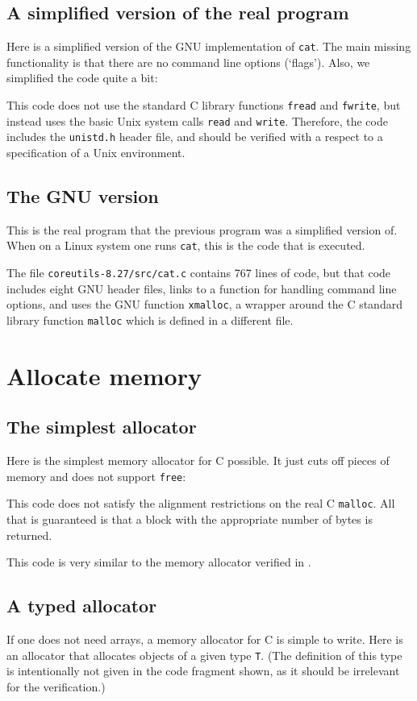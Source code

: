 \documentclass{article}
\begin{document}
\subsection{A simplified version of the real program}
Here is a simplified version of the GNU implementation of \texttt{cat}.
The main missing functionality is that there are no command line options (`flags').
Also, we simplified the code quite a bit:

This code does not use the standard C library functions
\texttt{fread} and \texttt{fwrite}, but instead
uses the basic Unix system calls \texttt{read} and \texttt{write}.
Therefore, the code includes the \texttt{unistd.h} header file,
and should be verified with a respect to a specification of a Unix
environment.

\subsection{The GNU version}
This is the real program that the previous program was a simplified version of.
When on a Linux system one runs \texttt{cat}, this is the code that is
executed.

The file \texttt{coreutils-8.27/src/cat.c} contains 767 lines of code,
but that code includes eight GNU header files,
links to a function for handling command line options, and uses
the GNU function \texttt{xmalloc}, a wrapper around the C standard library function
\texttt{malloc} which is defined in a different file.
\addtocounter{lstlisting}{1}

\section{Allocate memory}
\subsection{The simplest allocator}
Here is the simplest memory allocator for C possible.
It just cuts off pieces of memory and does not support \texttt{free}:

This code does not satisfy the alignment restrictions on the real
C \texttt{malloc}.
All that is guaranteed is that a block with the appropriate number of bytes is
returned.

This code is very similar to the memory allocator verified in \cite{ben:06,ben:06:1}.

\subsection{A typed allocator}
If one does not need arrays, a memory allocator for C is simple to write.
Here is an allocator that allocates objects of a given type \texttt{T}.
(The definition of this type is intentionally not given in the code
fragment shown, as it should be irrelevant for the verification.)
\end{document}
